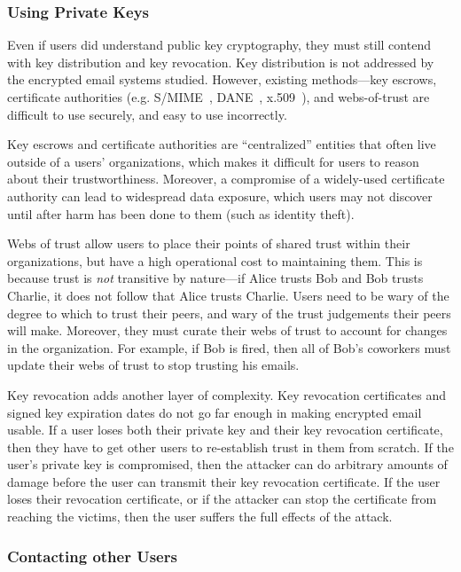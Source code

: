 \subsubsection{Using Private Keys}

Even if users did understand public key cryptography, they must still contend
with key distribution and key revocation.  Key distribution is not addressed by
the encrypted email systems studied.  However, existing methods---key escrows,
certificate authorities (e.g. S/MIME~\cite{smime}, DANE~\cite{dane},
x.509~\cite{x509}), and webs-of-trust are difficult to use securely, and easy to
use incorrectly.

Key escrows and certificate authorities are ``centralized''
entities that often live outside of a users' organizations, which makes it
difficult for users to reason about their trustworthiness.  Moreover, a
compromise of a widely-used certificate authority can lead to widespread
data exposure, which users may not discover until after harm has been done to
them (such as identity theft).

Webs of trust allow users to place their points of shared trust within
their organizations, but have a high operational cost to maintaining them.  This
is because trust is \emph{not} transitive by nature---if Alice trusts Bob and Bob
trusts Charlie, it does not follow that Alice trusts Charlie.  Users need to be
wary of the degree to which to trust their peers, and wary of the trust
judgements their peers will make.  Moreover, they must curate their webs of
trust to account for changes in the organization.  For example, if Bob is fired,
then all of Bob's coworkers must update their webs of trust to stop trusting his
emails.

Key revocation adds another layer of complexity.  Key revocation certificates
and signed key expiration dates do not go far enough in making encrypted email
usable.  If a user loses both their private key and their key revocation
certificate, then they have to get other users to re-establish trust in them
from scratch.  If the user's private key is compromised, then the attacker can
do arbitrary amounts of damage before the user can transmit their key revocation
certificate.  If the user loses their revocation certificate, or if the attacker
can stop the certificate from reaching the victims, then the user suffers the
full effects of the attack.

\subsubsection{Contacting other Users}

